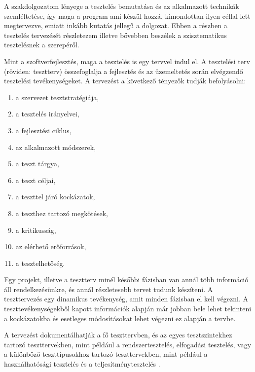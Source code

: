 
A szakdolgozatom lényege a tesztelés bemutatása és az alkalmazott technikák szemléltetése, így maga a program ami készül hozzá, kimondottan ilyen céllal lett megtervezve, emiatt inkább kutatás jellegű a dolgozat. Ebben a részben a tesztelés tervezését részletezem illetve bővebben beszélek a szisztematikus tesztelésnek a szerepéről.


Mint a szoftverfejlesztés, maga a tesztelés is egy tervvel indul el.
A tesztelési terv (röviden: tesztterv) összefoglalja a fejlesztés és az üzemeltetés során elvégzendő tesztelési tevékenységeket. A tervezést a következő tényezők tudják befolyásolni:
\begin{enumerate}
\item a szervezet tesztstratégiája,
\item a tesztelés irányelvei,
\item a fejlesztési ciklus,
\item az alkalmazott módszerek,
\item a teszt tárgya,
\item a teszt céljai,
\item a teszttel járó kockázatok,
\item a teszthez tartozó megkötések,
\item a kritikusság,
\item az elérhető erőforrások,
\item a tesztelhetőség.
\end{enumerate}

Egy projekt, illetve a tesztterv minél későbbi fázisban van annál több információ áll rendelkezésünkre, és annál részletesebb tervet tudunk készíteni. A teszttervezés egy dinamikus tevékenység, amit minden fázisban el kell végezni. A teszttevékenységekből kapott információk alapján már jobban bele lehet tekinteni a kockázatokba és esetleges módosításokat lehet végezni ez alapján a tervbe\cite{nelson2009accelerated}.

A tervezést dokumentálhatják a fő teszttervben, és az egyes tesztszintekhez tartozó teszttervekben, mint például a rendszertesztelés, elfogadási tesztelés, vagy a különböző teszttípusokhoz tartozó teszttervekben, mint például a használhatósági tesztelés és a teljesítménytesztelés \cite[~67. oldal]{syllabus}.

